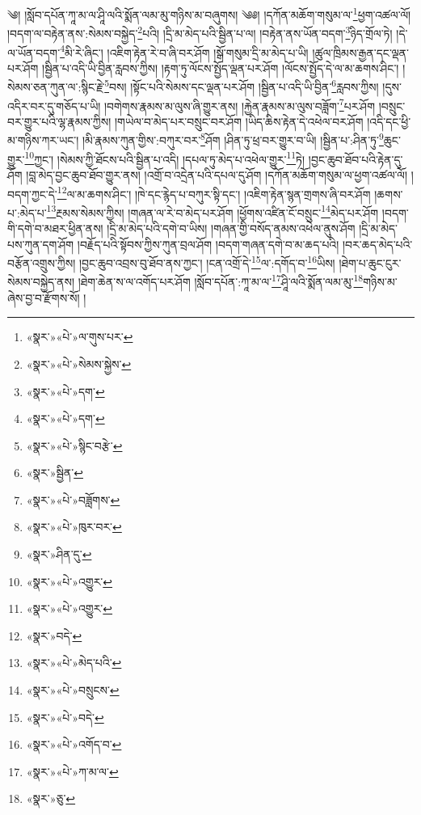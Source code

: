 ༄། །སློབ་དཔོན་ཀཱ་མ་ལ་ཤཱི་ལའི་སྨོན་ལམ་མུ་གཉིས་མ་བཞུགས། ༄༅། །དཀོན་མཆོག་གསུམ་ལ་\footnote{«སྣར་»«པེ་»ལ་གུས་པར་}ཕྱག་འཚལ་ལོ། །བདག་ལ་བརྟེན་ནས་:སེམས་བསྐྱེད་\footnote{«སྣར་»«པེ་»སེམས་སྐྱེས་}པའི། །དྲི་མ་མེད་པའི་སྦྱིན་པ་ལ། །བརྟེན་ནས་ཡོན་བདག་\footnote{«སྣར་»«པེ་»དག་}ཉིད་གྲོལ་ཏེ། །དེ་ལ་ཡོན་བདག་\footnote{«སྣར་»«པེ་»དག་}མི་རེ་ཞིང་། །འཇིག་རྟེན་རེ་བ་ཞི་བར་ཤོག །སྒོ་གསུམ་དྲི་མ་མེད་པ་ཡི། །ཚུལ་ཁྲིམས་རྒྱན་དང་ལྡན་པར་ཤོག །སྦྱིན་པ་འདི་ཡི་བྱིན་རླབས་ཀྱིས། །རྟག་ཏུ་ལོངས་སྤྱོད་ལྡན་པར་ཤོག །ལོངས་སྤྱོད་དེ་ལ་མ་ཆགས་ཤིང་། །སེམས་ཅན་ཀུན་ལ་:སྙིང་རྗེ་\footnote{«སྣར་»«པེ་»སྙིང་བརྩེ་}བས། །སྟོང་པའི་སེམས་དང་ལྡན་པར་ཤོག །སྦྱིན་པ་འདི་ཡི་བྱིན་\footnote{«སྣར་»སྦྱིན་}རླབས་ཀྱིས། །དུས་འདིར་བར་དུ་གཅོད་པ་ཡི། །བགེགས་རྣམས་མ་ལུས་ཞི་གྱུར་ནས། །རྐྱེན་རྣམས་མ་ལུས་བཟློག་\footnote{«སྣར་»«པེ་»བཟློགས་}པར་ཤོག །བསྲུང་བར་གྱུར་པའི་ལྷ་རྣམས་ཀྱིས། །གཡེལ་བ་མེད་པར་བསྲུང་བར་ཤོག །ཡིད་ཆིས་རྟེན་དེ་འཕེལ་བར་ཤོག །འདི་དང་ཕྱི་མ་གཉིས་ཀར་ཡང་། །མི་རྣམས་ཀུན་གྱིས་:བཀུར་བར་\footnote{«སྣར་»«པེ་»ཁུར་བར་}ཤོག །ཤིན་ཏུ་ཕྲ་བར་གྱུར་བ་ཡི། །སྦྱིན་པ་:ཤིན་ཏུ་\footnote{«སྣར་»ཤིན་དུ་}ཆུང་གྱུར་\footnote{«སྣར་»«པེ་»འགྱུར་}ཀྱང་། །སེམས་ཀྱི་ཐོངས་པའི་སྦྱིན་པ་འདི། །དཔལ་ཏུ་མེད་པ་འཕེལ་གྱུར་\footnote{«སྣར་»«པེ་»འགྱུར་}ཏེ། །བྱང་ཆུབ་ཐོབ་པའི་རྟེན་དུ་ཤོག །བླ་མེད་བྱང་ཆུབ་ཐོབ་གྱུར་ནས། །འགྲོ་བ་འདྲེན་པའི་དཔལ་དུ་ཤོག །དཀོན་མཆོག་གསུམ་ལ་ཕྱག་འཚལ་ལོ། །བདག་ཀྱང་དེ་\footnote{«སྣར་»བདེ་}ལ་མ་ཆགས་ཤིང་། །ཁེ་དང་རྙེད་པ་བཀུར་སྟི་དང་། །འཇིག་རྟེན་སྙན་གྲགས་ཞི་བར་ཤོག །ཆགས་པ་:མེད་པ་\footnote{«སྣར་»«པེ་»མེད་པའི་}རྔམས་སེམས་ཀྱིས། །གཞན་ལ་རེ་བ་མེད་པར་ཤོག །ཕྱོགས་འཛིན་ངོ་བསྲུང་\footnote{«སྣར་»«པེ་»བསྲུངས་}མེད་པར་ཤོག །བདག་གི་དགེ་བ་མཐར་ཕྱིན་ནས། །དྲི་མ་མེད་པའི་དགེ་བ་ཡིས། །གཞན་གྱི་བསོད་ནམས་འཕེལ་ནུས་ཤོག །དྲི་མ་མེད་པས་ཀུན་དག་ཤོག །བརྗོད་པའི་སྟོབས་ཀྱིས་ཀུན་བྲལ་ཤོག །བདག་གཞན་དགེ་བ་མ་ཆད་པའི། །བར་ཆད་མེད་པའི་བརྩོན་འགྲུས་ཀྱིས། །བྱང་ཆུབ་འབྲས་བུ་ཐོབ་ནས་ཀྱང་། །ངན་འགྲོ་དེ་\footnote{«སྣར་»«པེ་»བདེ་}ལ་:དགོད་བ་\footnote{«སྣར་»«པེ་»འགོད་བ་}ཡིས། །ཐེག་པ་ཆུང་ངུར་སེམས་བསྐྱེད་ནས། །ཐེག་ཆེན་ས་ལ་འགོད་པར་ཤོག །སློབ་དཔོན་:ཀཱ་མ་ལ་\footnote{«སྣར་»«པེ་»ཀ་མ་ལ་}ཤཱི་ལའི་སྨོན་ལམ་མུ་\footnote{«སྣར་»ཅུ་}གཉིས་མ་ཞེས་བྱ་བ་རྫོགས་སོ། ། 